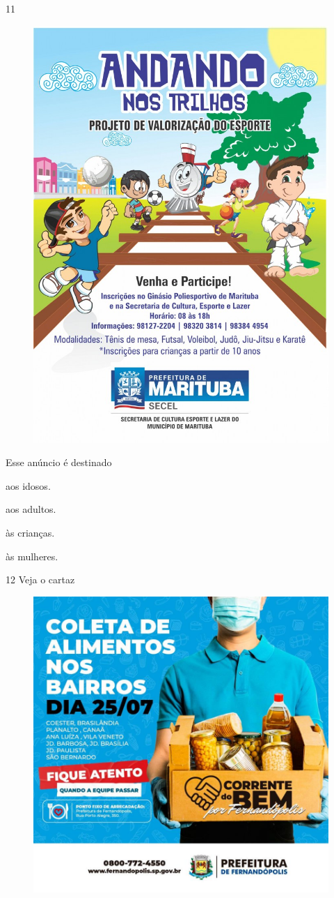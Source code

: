 \num{11}

\begin{figure}[htpb!]
\centering
\includegraphics[width=.5\textwidth]{media/image170.jpeg}
\end{figure}


Esse anúncio é destinado

\begin{escolha}
\item aos idosos.

\item aos adultos.

\item às crianças.

\item às mulheres.
\end{escolha}


\num{12} Veja o cartaz

\begin{figure}[htpb!]
\centering
\includegraphics[width=.5\textwidth]{media/image171.jpeg}
\end{figure}

